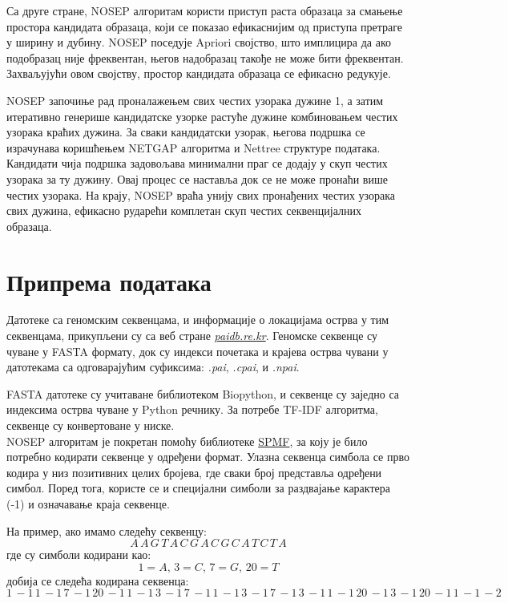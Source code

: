 \documentclass[12pt]{article}
\begin{document}
Са друге стране, NOSEP алгоритам користи приступ раста образаца за смањење простора кандидата образаца, који се показао ефикаснијим од приступа претраге у ширину и дубину. NOSEP поседује Apriori својство, што имплицира да ако подобразац није фреквентан, његов надобразац такође не може бити фреквентан. Захваљујући овом својству, простор кандидата образаца се ефикасно редукује.

NOSEP започиње рад проналажењем свих честих узорака дужине 1, а затим итеративно генерише кандидатске узорке растуће дужине комбиновањем честих узорака краћих дужина. За сваки кандидатски узорак, његова подршка се израчунава коришћењем NETGAP алгоритма и Nettree структуре података. Кандидати чија подршка задовољава минимални праг се додају у скуп честих узорака за ту дужину. Овај процес се наставља док се не може пронаћи више честих узорака. На крају, NOSEP враћа унију свих пронађених честих узорака свих дужина, ефикасно рударећи комплетан скуп честих секвенцијалних образаца.


\section{Припрема података}

Датотеке са геномским секвенцама, и информације о локацијама острва у тим секвенцама, прикупљени су са веб стране \textit{\href{paidb.re.kr}{paidb.re.kr}}. Геномске секвенце су чуване у FASTA формату, док су индекси почетака и крајева острва чувани у датотекама са одговарајућим суфиксима: \textit{.pai}, \textit{.cpai}, и \textit{.npai}.

FASTA датотеке су учитаване библиотеком Biopython, и секвенце су заједно са индексима острва чуване у Python речнику. За потребе TF-IDF алгоритма, секвенце су конвертоване у ниске. \\

NOSEP алгоритам је покретан помоћу библиотеке \href{https://www.philippe-fournier-viger.com/spmf}{SPMF}, за коју је било потребно кодирати секвенце у одређени формат. Улазна секвенца симбола се прво кодира у низ позитивних целих бројева, где сваки број представља одређени симбол. Поред тога, користе се и специјални симболи за раздвајање карактера (-1) и означавање краја секвенце.

На пример, ако имамо следећу секвенцу:
$$ A\,  A\, G\, T\, A\, C\, G\, A\, C\, G\, C\, A\, T\, C\, T\, A  $$
где су симболи кодирани као:
$$ 1 = A,\, 3 = C,\, 7 = G,\, 20 = T $$
добија се следећа кодирана секвенца:
$$ 1\, -1\, 1\, -1\, 7\, -1\, 20\, -1\, 1\, -1\, 3\, -1\, 7\, -1\, 1\, -1\, 3\, -1\, 7\, -1\, 3\, -1\, 1\, -1\, 20\, -1\, 3\, -1\, 20\, -1\, 1\, -1\, -2\, $$
\end{document}
